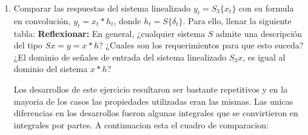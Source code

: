 \documentclass[12pt,a4paper]{report}
\begin{document}
\begin{enumerate}[label=\alph*)]
    \item Comparar las respuestas del sistema linealizado $y_t = S_3\{x_t\}$ con su formula en convolución,
      $y_t = x_t * h_t$, donde $h_t = S\{\delta_t\}$. Para ello, llenar la siguiente tabla:
      \textbf{Reflexionar:} En general, ¿cualquier sistema $S$ admite una descripción del tipo $S{x} = y = x * h$?
      ¿Cuales son los requerimientos para que esto suceda? ¿El dominio de señales de entrada del sistema linealizado
      $S_3{x}$, es igual al dominio del sistema $x * h$?

      Los desarrollos de este ejercicio resultaron ser bastante repetitivos y en la mayoria de los casos las
      propiedades utilizadas eran las mismas. Las unicas diferencias en los desarrollos fueron algunas integrales que
      se convirtieron en integrales por partes. A continuacion esta el cuadro de comparacion:
      

\end{enumerate}
\end{document}
